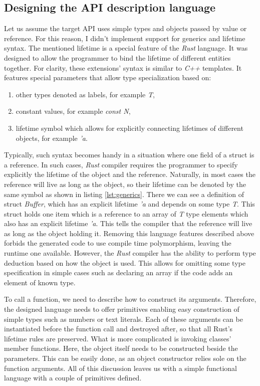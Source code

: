 \subsection{Designing the API description language}
Let us assume the target API uses simple types and objects passed by value or reference. For this reason, I didn't implement support for generics and lifetime syntax. The mentioned lifetime is a special feature of the \textit{Rust} language. It was designed to allow the programmer to bind the lifetime of different entities together. For clarity, these extensions' syntax is similar to \textit{C++} templates. It features special parameters that allow type specialization based on:
\begin{enumerate}
    \item other types denoted as labels, for example \textit{T},
    \item constant values, for example \textit{const N},
    \item lifetime symbol which allows for explicitly connecting lifetimes of different objects, for example \textit{'a}.
\end{enumerate}
Typically, such syntax becomes handy in a situation where one field of a struct is a reference. In such cases, \textit{Rust} compiler requires the programmer to specify explicitly the lifetime of the object and the reference. Naturally, in most cases the reference will live as long as the object, so their lifetime can be denoted by the same symbol as shown in listing \ref{lst:generics}. There we can see a definition of struct \textit{Buffer}, which has an explicit lifetime \textit{'a} and depends on some type \textit{T}. This struct holds one item which is a reference to an array of \textit{T} type elements which also has an explicit lifetime \textit{'a}. This tells the compiler that the reference will live as long as the object holding it. Removing this language features described above forbids the generated code to use compile time polymorphism, leaving the runtime one available. However, the \textit{Rust} compiler has the ability to perform type deduction based on how the object is used. This allows for omitting some type specification in simple cases such as declaring an array if the code adds an element of known type.

To call a function, we need to describe how to construct its arguments. Therefore, the designed language needs to offer primitives enabling easy construction of simple types such as numbers or text literals. Each of these arguments can be instantiated before the function call and destroyed after, so that all Rust's lifetime rules are preserved. What is more complicated is invoking classes' member functions. Here, the object itself needs to be constructed beside the parameters. This can be easily done, as an object constructor relies sole on the function arguments. All of this discussion leaves us with a simple functional language with a couple of primitives defined.


